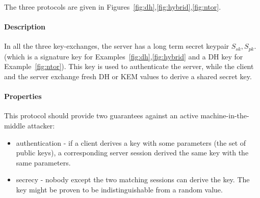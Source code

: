 \documentclass{article}
\newcommand{\sfsk}{\mathit{sk}}
\newcommand{\sfpk}{\mathit{pk}}
\begin{document}
The three protocols are given in Figures~\ref{fig:dh},\ref{fig:hybrid},\ref{fig:ntor}.

 \paragraph{Description}In all the three key-exchanges, the server has a long term secret keypair $S_\sfsk,S_\sfpk$. (which is a signature key for Examples~\ref{fig:dh},\ref{fig:hybrid} and a DH key for Example~\ref{fig:ntor}).
This key is used to authenticate the server, while the client and the server exchange fresh DH or KEM values to derive a shared secret key.

\paragraph{Properties} This protocol should provide two guarantees against an active machine-in-the-middle attacker:
\begin{itemize}
\item authentication - if a client derives a key with some parameters (the set of public keys), a corresponding server session derived the same key with the same parameters.
\item secrecy - nobody except the two matching sessions can derive the key.  The key might be proven to be indistinguishable from a random value.
\end{itemize}
\end{document}
